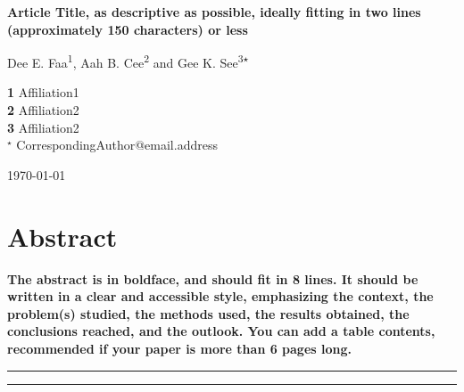 \documentclass[submission, Phys]{SciPost}
\begin{document}
\begin{center}{\Large \textbf{
Article Title, as descriptive as possible, ideally fitting in two lines (approximately 150 characters) or less\\
}}\end{center}

\begin{center}
Dee E. Faa\textsuperscript{1},
Aah B. Cee\textsuperscript{2} and
Gee K. See\textsuperscript{3$\star$}
\end{center}

\begin{center}
{\bf 1} Affiliation1
\\
{\bf 2} Affiliation2
\\
{\bf 3} Affiliation2
\\
${}^\star$ {\small \sf CorrespondingAuthor@email.address}
\end{center}

\begin{center}
\today
\end{center}


\section*{Abstract}
{\bf
The abstract is in boldface, and should fit in 8 lines.
It should be written in a clear and accessible style, emphasizing the context, the problem(s) studied, the methods used, the results obtained, the conclusions reached, and the outlook. You can add a table contents, recommended if your paper is more than 6 pages long.
}


\vspace{10pt}
\noindent\rule{\textwidth}{1pt}
\tableofcontents\thispagestyle{fancy}
\noindent\rule{\textwidth}{1pt}
\vspace{10pt}
\end{document}
